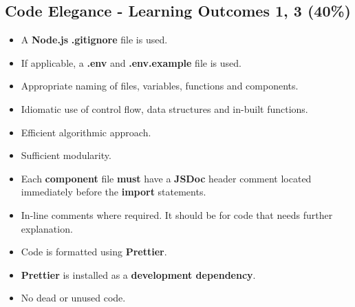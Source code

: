 \documentclass{article}
\begin{document}
\subsection*{Code Elegance - Learning Outcomes 1, 3 (40\%)}
\begin{itemize}
	\item A \textbf{Node.js} \textbf{.gitignore} file is used.
	\item If applicable, a \textbf{.env} and \textbf{.env.example} file is used.
  \item Appropriate naming of files, variables, functions and components.
	\item Idiomatic use of control flow, data structures and in-built functions.
  \item Efficient algorithmic approach.
  \item Sufficient modularity.
  \item Each \textbf{component} file \textbf{must} have a \textbf{JSDoc} header comment located immediately before the \textbf{import} statements.
\item In-line comments where required. It should be for code that needs further explanation.
  \item Code is formatted using \textbf{Prettier}.
  \item \textbf{Prettier} is installed as a \textbf{development dependency}.	
\item No dead or unused code. 
\end{itemize}
\end{document}
